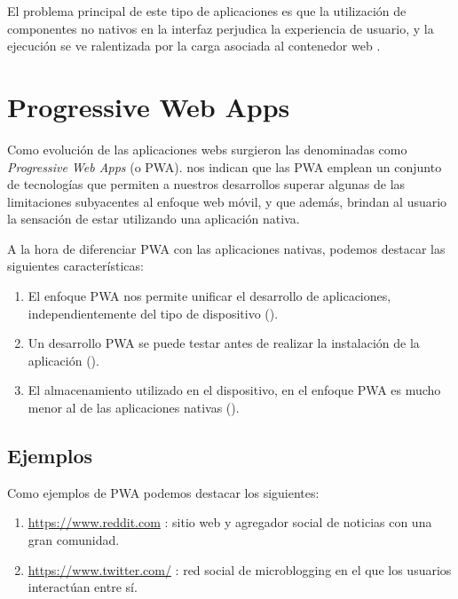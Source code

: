 \documentclass{\ClassPath/viu-tfm-template}
\begin{document}
El problema principal de este tipo de aplicaciones es que la utilización de componentes no nativos en la interfaz perjudica la experiencia de usuario, y la ejecución se ve ralentizada por la carga asociada al contenedor web \parencite{thomas_2020}.

\chapter{Progressive Web Apps}

Como evolución de las aplicaciones webs surgieron las denominadas como \textit{Progressive Web Apps} (o PWA). \textcite{aguirre2019pwa} nos indican que las PWA emplean un conjunto de tecnologías que permiten a nuestros desarrollos superar algunas de las limitaciones subyacentes al enfoque web móvil, y que además, brindan al usuario la sensación de estar utilizando una aplicación nativa.

A la hora de diferenciar PWA con las aplicaciones nativas, podemos destacar las siguientes características:
\vspace{-1.2em}
\begin{enumerate}
    \item El enfoque PWA nos permite unificar el desarrollo de aplicaciones, independientemente del tipo de dispositivo (\cite{aguirre2019pwa}).
    \item Un desarrollo PWA se puede testar antes de realizar la instalación de la aplicación (\cite{webist17}).
    \item El almacenamiento utilizado en el dispositivo, en el enfoque PWA es mucho menor al de las aplicaciones nativas (\cite{webist17}).
\end{enumerate}
\vspace{-1.2em}

\section{Ejemplos}

Como ejemplos de PWA podemos destacar los siguientes:
\vspace{-1.2em}
\begin{enumerate}
    \item \href{https://www.reddit.com/}{https://www.reddit.com} : sitio web y agregador social de noticias con una gran comunidad.
    \item \href{https://www.twitter.com/}{https://www.twitter.com/} : red social de microblogging en el que los usuarios interactúan entre sí.
\end{enumerate}
\vspace{-1.2em}
\end{document}

